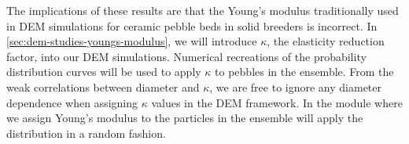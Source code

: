 The implications of these results are that the Young's modulus traditionally used in DEM simulations for ceramic pebble beds in solid breeders is incorrect. In \cref{sec:dem-studies-youngs-modulus}, we will introduce $\kappa$, the elasticity reduction factor, into our DEM simulations. Numerical recreations of the probability distribution curves will be used to apply $\kappa$ to pebbles in the ensemble. From the weak correlations between diameter and $\kappa$, we are free to ignore any diameter dependence when assigning $\kappa$ values in the DEM framework. In the module where we assign Young's modulus to the particles in the ensemble will apply the distribution in a random fashion.

\FloatBarrier